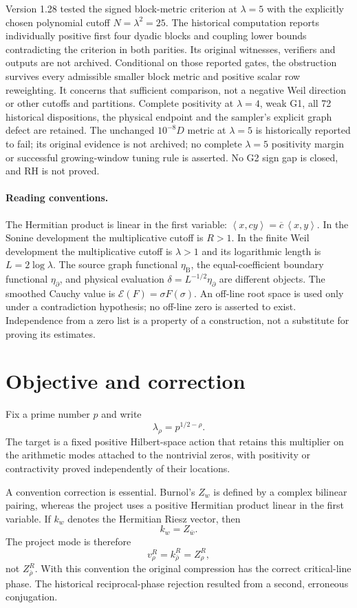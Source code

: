 \documentclass[11pt]{article}
\theoremstyle{remark}
\newcommand{\ip}[2]{\left\langle #1,#2\right\rangle}
\begin{document}
Version 1.28 tested the signed block-metric criterion at $\lambda=5$
with the explicitly chosen polynomial cutoff $N=\lambda^2=25$.
The historical computation reports individually positive first four
dyadic blocks and coupling lower bounds contradicting the criterion in
both parities. Its original witnesses, verifiers and outputs are not
archived. Conditional on those reported gates, the obstruction survives
every admissible smaller block metric and positive scalar row reweighting.
It concerns that sufficient comparison, not a negative Weil direction
or other cutoffs and partitions.
Complete positivity at $\lambda=4$, weak G1, all 72 historical
dispositions, the physical endpoint and the sampler's explicit graph
defect are retained. The unchanged $10^{-8}D$ metric at $\lambda=5$
is historically reported to fail; its original evidence is not archived; no complete $\lambda=5$ positivity margin or
successful growing-window tuning rule is asserted. No G2 sign gap
is closed, and RH is not proved.

\paragraph{Reading conventions.}
The Hermitian product is linear in the first variable:
$\ip{x}{cy}=\overline c\,\ip{x}{y}$.
In the Sonine development the multiplicative cutoff is $R>1$.
In the finite Weil development the multiplicative cutoff is $\lambda>1$
and its logarithmic length is $L=2\log\lambda$.
The source graph functional $\eta_{\mathrm B}$, the equal-coefficient
boundary functional $\eta_\partial$, and physical evaluation
$\delta=L^{-1/2}\eta_\partial$ are different objects.
The smoothed Cauchy value is $\mathscr E(F)=\sigma F(\sigma)$.
An off-line root space is used only under a contradiction hypothesis;
no off-line zero is asserted to exist. Independence from a zero list is
a property of a construction, not a substitute for proving its estimates.

\clearpage
\tableofcontents
\clearpage
\section{Objective and correction}
Fix a prime number $p$ and write
\[
  \lambda_\rho=p^{1/2-\rho}.
\]
The target is a fixed positive Hilbert-space action that retains this multiplier on the arithmetic modes attached to the nontrivial zeros, with positivity or contractivity proved independently of their locations.

A convention correction is essential. Burnol's $Z_w$ is defined by a complex bilinear pairing, whereas the project uses a positive Hermitian product linear in the first variable. If $k_w$ denotes the Hermitian Riesz vector, then
\[
  k_w=Z_{\bar w}.
\]
The project mode is therefore
\[
  v_\rho^R=k_{\bar\rho}^R=Z_\rho^R,
\]
not $Z_{\bar\rho}^R$. With this convention the original compression has the correct critical-line phase. The historical reciprocal-phase rejection resulted from a second, erroneous conjugation.
\end{document}
